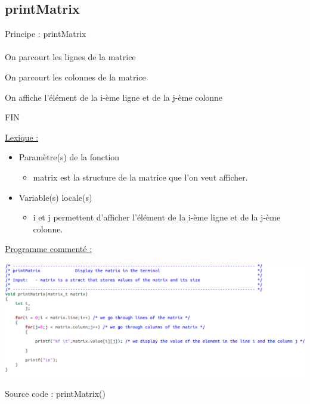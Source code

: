 \documentclass[a4paper]{article}
\newcommand\tab[1][1cm]{\hspace*{#1}}
\begin{document}
\subsection{printMatrix}
\begin{algorithm}
Principe : printMatrix
\\
\\
\tab On parcourt les lignes de la matrice

\tab \tab On parcourt les colonnes de la matrice 

\tab \tab \tab On affiche l'élément de la i-ème ligne et de la j-ème colonne 

FIN
\end{algorithm}

\underline{Lexique :}
\begin{itemize}
\item Paramètre(s) de la fonction  
\begin{itemize}
\item matrix est la structure de la matrice que l'on veut afficher.
\end{itemize}
\item Variable(s) locale(s)
\begin{itemize}
\item i et j permettent d'afficher l'élément de la i-ème ligne et de la j-ème colonne.
\end{itemize}
\end{itemize}

\underline{Programme commenté :}
\begin{center}
\includegraphics[scale=0.39]{printMatrix.png}

Source code : printMatrix()
\end{center}
\newpage
\end{document}
